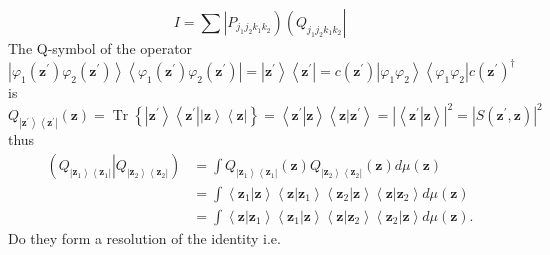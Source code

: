 \documentclass[aps,preprint]{revtex4}%
\begin{document}
\begin{equation}
I=\sum\left\vert P_{j_{1}j_{2}k_{1}k_{2}}\right)  \left(  Q_{j_{1}j_{2}%
k_{1}k_{2}}\right\vert
\end{equation}
The Q-symbol of the operator
\begin{equation}
\left\vert \varphi_{1}\left(  \mathbf{z}^{\prime}\right)  \varphi_{2}\left(
\mathbf{z}^{\prime}\right)  \right\rangle \left\langle \varphi_{1}\left(
\mathbf{z}^{\prime}\right)  \varphi_{2}\left(  \mathbf{z}^{\prime}\right)
\right\vert =\left\vert \mathbf{z}^{\prime}\right\rangle \left\langle
\mathbf{z}^{\prime}\right\vert =c\left(  \mathbf{z}^{\prime}\right)
\left\vert \varphi_{1}\varphi_{2}\right\rangle \left\langle \varphi_{1}%
\varphi_{2}\right\vert c\left(  \mathbf{z}^{\prime}\right)  ^{\dagger}%
\end{equation}
is
\begin{equation}
Q_{\left\vert \mathbf{z}^{\prime}\right\rangle \left\langle \mathbf{z}%
^{\prime}\right\vert }\left(  \mathbf{z}\right)  =\operatorname*{Tr}\left\{
\left\vert \mathbf{z}^{\prime}\right\rangle \left\langle \mathbf{z}^{\prime
}\right\vert \left\vert \mathbf{z}\right\rangle \left\langle \mathbf{z}%
\right\vert \right\}  =\left\langle \left.  \mathbf{z}^{\prime}\right\vert
\mathbf{z}\right\rangle \left\langle \left.  \mathbf{z}\right\vert
\mathbf{z}^{\prime}\right\rangle =\left\vert \left\langle \left.
\mathbf{z}^{\prime}\right\vert \mathbf{z}\right\rangle \right\vert
^{2}=\left\vert S\left(  \mathbf{z}^{\prime},\mathbf{z}\right)  \right\vert
^{2}%
\end{equation}
thus
\begin{align}
\left(  Q_{\left\vert \mathbf{z}_{1}\right\rangle \left\langle \mathbf{z}%
_{1}\right\vert }\left\vert Q_{\left\vert \mathbf{z}_{2}\right\rangle
\left\langle \mathbf{z}_{2}\right\vert }\right.  \right)   &  =\int
Q_{\left\vert \mathbf{z}_{1}\right\rangle \left\langle \mathbf{z}%
_{1}\right\vert }\left(  \mathbf{z}\right)  Q_{\left\vert \mathbf{z}%
_{2}\right\rangle \left\langle \mathbf{z}_{2}\right\vert }\left(
\mathbf{z}\right)  d\mu\left(  \mathbf{z}\right) \\
&  =\int\left\langle \left.  \mathbf{z}_{1}\right\vert \mathbf{z}\right\rangle
\left\langle \left.  \mathbf{z}\right\vert \mathbf{z}_{1}\right\rangle
\left\langle \left.  \mathbf{z}_{2}\right\vert \mathbf{z}\right\rangle
\left\langle \left.  \mathbf{z}\right\vert \mathbf{z}_{2}\right\rangle
d\mu\left(  \mathbf{z}\right) \\
&  =\int\left\langle \left.  \mathbf{z}\right\vert \mathbf{z}_{1}\right\rangle
\left\langle \left.  \mathbf{z}_{1}\right\vert \mathbf{z}\right\rangle
\left\langle \left.  \mathbf{z}\right\vert \mathbf{z}_{2}\right\rangle
\left\langle \left.  \mathbf{z}_{2}\right\vert \mathbf{z}\right\rangle
d\mu\left(  \mathbf{z}\right)  .
\end{align}
Do they form a resolution of the identity i.e.%
\end{document}
